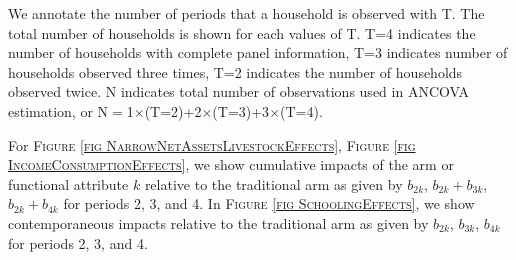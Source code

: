 	We annotate the number of periods that a household is observed with \textsf{T}. The total number of households is shown for each values of \textsf{T}. \textsf{T=4} indicates the number of households with complete panel information, \textsf{T=3} indicates number of households observed three times, \textsf{T=2} indicates the number of households observed twice. \textsf{N} indicates total number of observations used in ANCOVA estimation, or \textsf{N$=$1$\times$(T=2)+2$\times$(T=3)+3$\times$(T=4)}. 
	
	For \textsc{\footnotesize Figure \ref{fig NarrowNetAssetsLivestockEffects}}, \textsc{\small Figure \ref{fig IncomeConsumptionEffects}}, we show cumulative impacts of the arm or functional attribute $k$ relative to the \textsf{traditional} arm as given by $b_{2k}$, $b_{2k}+b_{3k}$,  $b_{2k}+b_{4k}$ for periods 2, 3, and 4. In \textsc{\footnotesize Figure \ref{fig SchoolingEffects}}, we show contemporaneous impacts relative to the \textsf{traditional} arm as given by $b_{2k}$, $b_{3k}$,  $b_{4k}$ for periods 2, 3, and 4.




